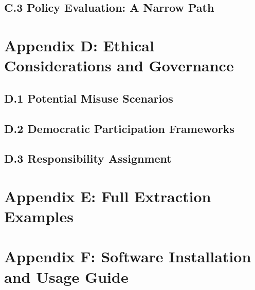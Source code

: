 \documentclass[
  11pt,
  letterpaper,
]{book}
\begin{document}
\subsection*{C.3 Policy Evaluation: A Narrow
Path}\label{sec-narrow-path-evaluation}

\section*{Appendix D: Ethical Considerations and
Governance}\label{sec-appendix-ethical}


\subsection*{D.1 Potential Misuse Scenarios}\label{sec-misuse-scenarios}

\subsection*{D.2 Democratic Participation
Frameworks}\label{sec-democratic-frameworks}

\subsection*{D.3 Responsibility Assignment}\label{sec-responsibility}

\section*{Appendix E: Full Extraction
Examples}\label{sec-appendix-examples}


\section*{Appendix F: Software Installation and Usage
Guide}\label{sec-appendix-software}
\end{document}
